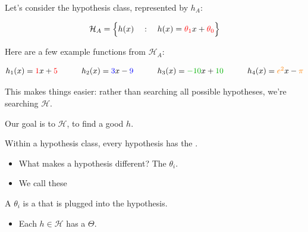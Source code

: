         \miniex Let's consider the hypothesis class, represented by $h_A$:

        \begin{equation}
            \mathcal{H}_A = \Bigl\{h(x) \quad : \quad h(x) = \textcolor{red}{\theta_1} x + \textcolor{red}{\theta_0}  \Bigr\}
        \end{equation}

        Here are a few example functions from $\mathcal{H}_A$:

        \begin{equation*}
            \begin{matrix}
                h_1(x) = \red{1}x+\red{5} &&&  h_2(x) = \blu{3}x-\blu{9} &&& h_3(x) = \grn{-10}x+\grn{10} &&& h_4(x) =\org{e^2}x-\org{\pi}
            \end{matrix} 
        \end{equation*}

        This makes things easier: rather than searching all possible hypotheses, we're searching $\mathcal{H}$.\\

        \begin{concept}
            Our goal is to  $\mathcal{H}$, to find a good  $h$.
        \end{concept}

        Within a hypothesis class, every hypothesis has the .

        \begin{itemize}
            \item What makes a hypothesis different? The  $\theta_i$.

            \item We call these \\
        \end{itemize}

        \begin{definition}
            A  $\theta_i$ is a  that is plugged into the hypothesis.

            \begin{itemize}
                \item Each  $h \in \mathcal{H}$ has a  $\Theta$.
            \end{itemize}
        \end{definition}

